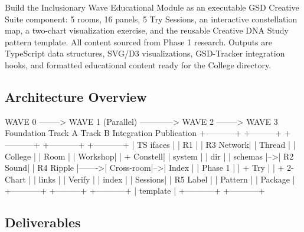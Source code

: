 \documentclass[11pt,letterpaper]{article}
\begin{document}
Build the Inclusionary Wave Educational Module as an executable GSD Creative Suite component: 5 rooms, 16 panels, 5 Try Sessions, an interactive constellation map, a two-chart visualization exercise, and the reusable Creative DNA Study pattern template. All content sourced from Phase 1 research. Outputs are TypeScript data structures, SVG/D3 visualizations, GSD-Tracker integration hooks, and formatted educational content ready for the College directory.

\subsection{Architecture Overview}

\begin{asciibox}
  WAVE 0 --------> WAVE 1 (Parallel) ------------> WAVE 2 --------> WAVE 3
  Foundation       Track A       Track B             Integration      Publication
  +-----------+   +---------+  +-----------+        +-----------+   +-----------+
  | TS ifaces |   | R1      |  | R3 Network|        | Thread    |   | College   |
  | Room      |   | Workshop|  | + Constell|        | system    |   | dir       |
  | schemas   |-->| R2 Sound|  | R4 Ripple |------->| Cross-room|-->| Index     |
  | Phase 1   |   | + Try   |  | + 2-Chart |        | links     |   | Verify    |
  | index     |   | Sessions|  | R5 Label  |        | Pattern   |   | Package   |
  +-----------+   +---------+  +-----------+        | template  |   +-----------+
                                                    +-----------+
\end{asciibox}

\subsection{Deliverables}
\end{document}
